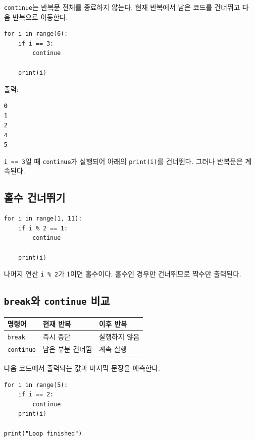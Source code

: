 \documentclass[11pt,a4paper]{article}
\begin{document}
\texttt{continue}는 반복문 전체를 종료하지 않는다. 현재 반복에서 남은 코드를 건너뛰고 다음 반복으로 이동한다.

\begin{lstlisting}
for i in range(6):
    if i == 3:
        continue

    print(i)
\end{lstlisting}

출력:

\begin{verbatim}
0
1
2
4
5
\end{verbatim}

\texttt{i == 3}일 때 \texttt{continue}가 실행되어 아래의 \texttt{print(i)}를 건너뛴다. 그러나 반복문은 계속된다.

\subsection{홀수 건너뛰기}

\begin{lstlisting}
for i in range(1, 11):
    if i % 2 == 1:
        continue

    print(i)
\end{lstlisting}

나머지 연산 \texttt{i \% 2}가 1이면 홀수이다. 홀수인 경우만 건너뛰므로 짝수만 출력된다.

\subsection{\texttt{break}와 \texttt{continue} 비교}

\begin{center}
\begin{tabular}{lll}
\toprule
명령어 & 현재 반복 & 이후 반복 \\
\midrule
\texttt{break} & 즉시 중단 & 실행하지 않음 \\
\texttt{continue} & 남은 부분 건너뜀 & 계속 실행 \\
\bottomrule
\end{tabular}
\end{center}

\begin{checkpointbox}
다음 코드에서 출력되는 값과 마지막 문장을 예측한다.
\begin{lstlisting}
for i in range(5):
    if i == 2:
        continue
    print(i)

print("Loop finished")
\end{lstlisting}
\end{checkpointbox}
\end{document}
